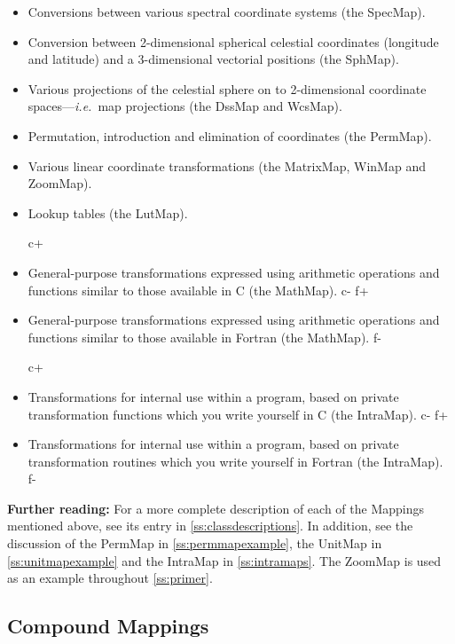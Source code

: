 \documentclass[twoside,11pt]{article}
\newcommand{\appref}[1]{Appendix~\ref{#1}}
\newcommand{\secref}[1]{\S\ref{#1}}
\renewcommand{\appref}[1]{\ref{#1}}
\renewcommand{\secref}[1]{\ref{#1}}
\begin{document}
{\begin{itemize}
\item Conversions between various spectral coordinate systems (the
SpecMap).

\item Conversion between 2-dimensional spherical celestial coordinates
(longitude and latitude) and a 3-dimensional vectorial positions (the SphMap).

\item Various projections of the celestial sphere on to 2-dimensional
coordinate spaces---{\em{i.e.}}\ map projections (the DssMap and WcsMap).

\item Permutation, introduction and elimination of coordinates (the
PermMap).

\item Various linear coordinate transformations (the MatrixMap, WinMap
and ZoomMap).

\item Lookup tables (the LutMap).

c+
\item General-purpose transformations expressed using arithmetic
operations and functions similar to those available in C (the
MathMap).
c-
f+
\item General-purpose transformations expressed using arithmetic
operations and functions similar to those available in Fortran (the
MathMap).
f-

c+
\item Transformations for internal use within a program, based on
private transformation functions which you write yourself in C (the
IntraMap).
c-
f+
\item Transformations for internal use within a program, based on
private transformation routines which you write yourself in Fortran
(the IntraMap).
f-
\end{itemize}

{\bf{Further reading:}} For a more complete description of each of the
Mappings mentioned above, see its entry in
\appref{ss:classdescriptions}. In addition, see the discussion of the
PermMap in \secref{ss:permmapexample}, the UnitMap in
\secref{ss:unitmapexample} and the IntraMap in
\secref{ss:intramaps}. The ZoomMap is used as an example throughout
\secref{ss:primer}.

\subsection{\label{ss:cmpmapoverview}Compound Mappings}

}
\end{document}
